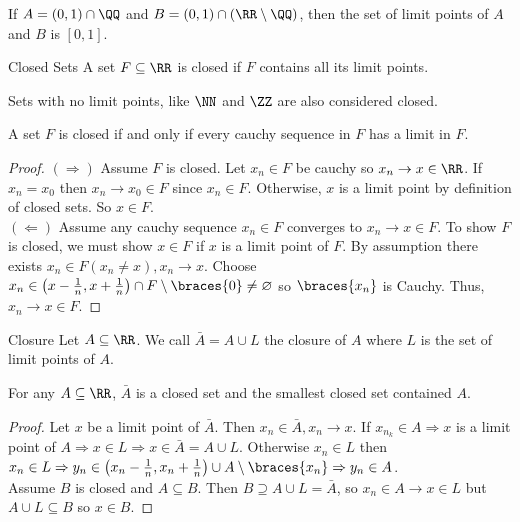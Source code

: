 If $A = (0, 1) \cap \QQ$ and $B = (0, 1) \cap (\RR \setminus \QQ)$, then the set of limit points of $A$ and $B$ is $[0, 1]$.

\begin{defbox}{Closed Sets}{}{}
    A set $F \subseteq \RR$ is closed if $F$ contains all its limit points. 
\end{defbox}

Sets with no limit points, like $\NN$ and $\ZZ$ are also considered closed.

\begin{thm}{}{}
    A set $F$ is closed if and only if every cauchy sequence in $F$ has a limit in $F$.

    \begin{proof}
        $(\Rightarrow)$ Assume $F$ is closed. Let $x_n \in F$ be cauchy so $x_n \to x \in \RR$. If $x_n = x_0$ then $x_n \to x_0 \in F$ since $x_n \in F$. Otherwise, $x$ is a limit point by definition of closed sets. So $x \in F$. \\
        $(\Leftarrow)$ Assume any cauchy sequence $x_n \in F$ converges to $x_n \to x \in F$. To show $F$ is closed, we must show $x \in F$ if $x$ is a limit point of $F$. By assumption there exists $x_n \in F(x_n \neq x), x_n \to x$. Choose $x_n \in \left(x - \frac{1}{n}, x + \frac{1}{n}\right) \cap F \setminus \braces{0} \neq \varnothing$ so $\braces{x_n}$ is Cauchy. Thus, $x_n \to x \in F$.
    \end{proof}
\end{thm}

\begin{defbox}{Closure}{}{}
    Let $A \subseteq \RR$. We call $\bar{A} = A \cup L$ the closure of $A$ where $L$ is the set of limit points of $A$.
\end{defbox}

\begin{thm}{}
    For any $A \subseteq \RR$, $\bar{A}$ is a closed set and the smallest closed set contained $A$.

    \begin{proof}
        Let $x$ be a limit point of $\bar{A}$. Then $x_n \in \bar{A}, x_n \to x$. If $x_{n_{k}} \in A \Rightarrow x$ is a limit point of $A \Rightarrow x \in L \Rightarrow x \in \bar{A} = A \cup L$. Otherwise $x_n \in L$ then $x_n \in L \Rightarrow y_n \in \left(x_n - \frac{1}{n}, x_n + \frac{1}{n}\right) \cup A \setminus \braces{x_n} \Rightarrow y_n \in A$. \\ Assume $B$ is closed and $A \subseteq B$. Then $B \supseteq A \cup L = \bar{A}$, so $x_n \in A \to x \in L$ but $A \cup L \subseteq B$ so $x \in B$.
    \end{proof}
\end{thm}

